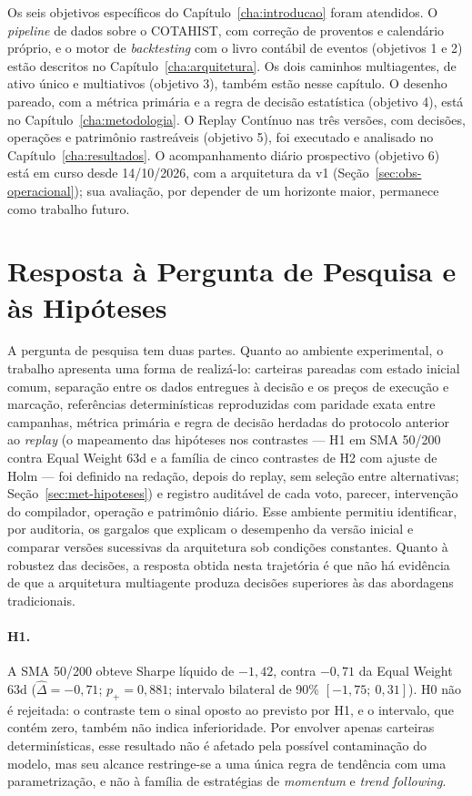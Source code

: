 Os seis objetivos específicos do Capítulo~\ref{cha:introducao} foram atendidos. O \textit{pipeline} de dados sobre o COTAHIST, com correção de proventos e calendário próprio, e o motor de \textit{backtesting} com o livro contábil de eventos (objetivos 1 e 2) estão descritos no Capítulo~\ref{cha:arquitetura}. Os dois caminhos multiagentes, de ativo único e multiativos (objetivo 3), também estão nesse capítulo. O desenho pareado, com a métrica primária e a regra de decisão estatística (objetivo 4), está no Capítulo~\ref{cha:metodologia}. O Replay Contínuo nas três versões, com decisões, operações e patrimônio rastreáveis (objetivo 5), foi executado e analisado no Capítulo~\ref{cha:resultados}. O acompanhamento diário prospectivo (objetivo 6) está em curso desde 14/10/2026, com a arquitetura da v1 (Seção~\ref{sec:obs-operacional}); sua avaliação, por depender de um horizonte maior, permanece como trabalho futuro.

\section{Resposta à Pergunta de Pesquisa e às Hipóteses}

A pergunta de pesquisa tem duas partes. Quanto ao ambiente experimental, o trabalho apresenta uma forma de realizá-lo: carteiras pareadas com estado inicial comum, separação entre os dados entregues à decisão e os preços de execução e marcação, referências determinísticas reproduzidas com paridade exata entre campanhas, métrica primária e regra de decisão herdadas do protocolo anterior ao \textit{replay} (o mapeamento das hipóteses nos contrastes --- H1 em SMA 50/200 contra Equal Weight 63d e a família de cinco contrastes de H2 com ajuste de Holm --- foi definido na redação, depois do replay, sem seleção entre alternativas; Seção~\ref{sec:met-hipoteses}) e registro auditável de cada voto, parecer, intervenção do compilador, operação e patrimônio diário. Esse ambiente permitiu identificar, por auditoria, os gargalos que explicam o desempenho da versão inicial e comparar versões sucessivas da arquitetura sob condições constantes. Quanto à robustez das decisões, a resposta obtida nesta trajetória é que não há evidência de que a arquitetura multiagente produza decisões superiores às das abordagens tradicionais.

\paragraph*{H1.} A SMA 50/200 obteve Sharpe líquido de $-1{,}42$, contra $-0{,}71$ da Equal Weight 63d ($\hat{\Delta} = -0{,}71$; $p_{+} = 0{,}881$; intervalo bilateral de 90\% $[-1{,}75;\ 0{,}31]$). H0 não é rejeitada: o contraste tem o sinal oposto ao previsto por H1, e o intervalo, que contém zero, também não indica inferioridade. Por envolver apenas carteiras determinísticas, esse resultado não é afetado pela possível contaminação do modelo, mas seu alcance restringe-se a uma única regra de tendência com uma parametrização, e não à família de estratégias de \textit{momentum} e \textit{trend following}.

